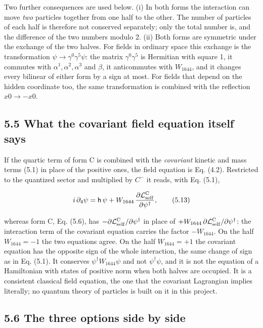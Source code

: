 \documentclass[
  10pt,
]{article}
\begin{document}
Two further consequences are used below. (i) In both forms the
interaction can move \emph{two} particles together from one half to the
other. The number of particles of each half is therefore not conserved
separately; only the total number is, and the difference of the two
numbers modulo 2. (ii) Both forms are symmetric under the exchange of
the two halves. For fields in ordinary space this exchange is the
transformation \(\psi\to\gamma^0\gamma^5\psi\): the matrix
\(\gamma^0\gamma^5\) is Hermitian with square 1, it commutes with
\(\alpha^1,\alpha^2,\alpha^3\) and \(\beta\), it anticommutes with
\(W_{1644}\), and it changes every bilinear of either form by a sign at
most. For fields that depend on the hidden coordinate too, the same
transformation is combined with the reflection \(x0\to-x0\).

\hypertarget{what-the-covariant-field-equation-itself-says}{%
\subsection{5.5 What the covariant field equation itself
says}\label{what-the-covariant-field-equation-itself-says}}

If the quartic term of form C is combined with the \emph{covariant}
kinetic and mass terms (5.1) in place of the positive ones, the field
equation is Eq. (4.2). Restricted to the quantized sector and multiplied
by \(C^-\) it reads, with Eq. (5.1),

\[i\,\partial_4\psi=\mathsf h\,\psi+W_{1644}\,\frac{\partial\mathcal L_{\rm self}^{\rm C}}{\partial\psi^\dagger},\tag{5.13}\]

whereas form C, Eq. (5.6), has
\(-\partial\mathcal L_{\rm self}^{\rm C}/\partial\psi^\dagger\) in place
of
\(+W_{1644}\,\partial\mathcal L_{\rm self}^{\rm C}/\partial\psi^\dagger\):
the interaction term of the covariant equation carries the factor
\(-W_{1644}\). On the half \(W_{1644}=-1\) the two equations agree. On
the half \(W_{1644}=+1\) the covariant equation has the opposite sign of
the whole interaction, the same change of sign as in Eq. (5.1). It
conserves \(\psi^\dagger W_{1644}\psi\) and not \(\psi^\dagger\psi\),
and it is not the equation of a Hamiltonian with states of positive norm
when both halves are occupied. It is a consistent classical field
equation, the one that the covariant Lagrangian implies literally; no
quantum theory of particles is built on it in this project.

\hypertarget{the-three-options-side-by-side}{%
\subsection{5.6 The three options side by
side}\label{the-three-options-side-by-side}}
\end{document}
